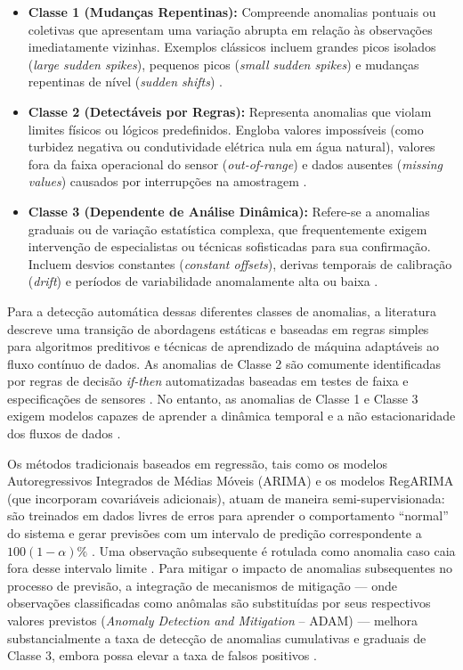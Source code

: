 \begin{itemize}
    \item \textbf{Classe 1 (Mudanças Repentinas):} Compreende anomalias pontuais ou coletivas que apresentam uma variação abrupta em relação às observações imediatamente vizinhas. Exemplos clássicos incluem grandes picos isolados (\textit{large sudden spikes}), pequenos picos (\textit{small sudden spikes}) e mudanças repentinas de nível (\textit{sudden shifts}) \cite{leigh2019framework}. 
    \item \textbf{Classe 2 (Detectáveis por Regras):} Representa anomalias que violam limites físicos ou lógicos predefinidos. Engloba valores impossíveis (como turbidez negativa ou condutividade elétrica nula em água natural), valores fora da faixa operacional do sensor (\textit{out-of-range}) e dados ausentes (\textit{missing values}) causados por interrupções na amostragem \cite{leigh2019framework}.
    \item \textbf{Classe 3 (Dependente de Análise Dinâmica):} Refere-se a anomalias graduais ou de variação estatística complexa, que frequentemente exigem intervenção de especialistas ou técnicas sofisticadas para sua confirmação. Incluem desvios constantes (\textit{constant offsets}), derivas temporais de calibração (\textit{drift}) e períodos de variabilidade anomalamente alta ou baixa \cite{leigh2019framework}.
\end{itemize}

Para a detecção automática dessas diferentes classes de anomalias, a literatura descreve uma transição de abordagens estáticas e baseadas em regras simples para algoritmos preditivos e técnicas de aprendizado de máquina adaptáveis ao fluxo contínuo de dados. As anomalias de Classe 2 são comumente identificadas por regras de decisão \textit{if-then} automatizadas baseadas em testes de faixa e especificações de sensores \cite{leigh2019framework}. No entanto, as anomalias de Classe 1 e Classe 3 exigem modelos capazes de aprender a dinâmica temporal e a não estacionaridade dos fluxos de dados \cite{leigh2019framework, sun2019building}.

Os métodos tradicionais baseados em regressão, tais como os modelos Autoregressivos Integrados de Médias Móveis (ARIMA) e os modelos RegARIMA (que incorporam covariáveis adicionais), atuam de maneira semi-supervisionada: são treinados em dados livres de erros para aprender o comportamento ``normal'' do sistema e gerar previsões com um intervalo de predição correspondente a $100(1-\alpha)\%$ \cite{leigh2019framework}. Uma observação subsequente é rotulada como anomalia caso caia fora desse intervalo limite \cite{leigh2019framework}. Para mitigar o impacto de anomalias subsequentes no processo de previsão, a integração de mecanismos de mitigação --- onde observações classificadas como anômalas são substituídas por seus respectivos valores previstos (\textit{Anomaly Detection and Mitigation} -- ADAM) --- melhora substancialmente a taxa de detecção de anomalias cumulativas e graduais de Classe 3, embora possa elevar a taxa de falsos positivos \cite{leigh2019framework}.

